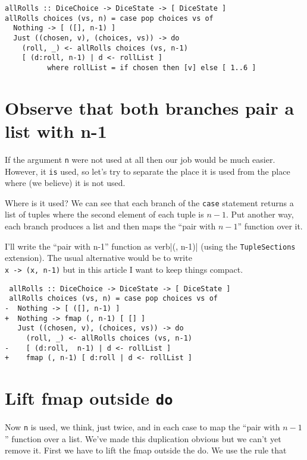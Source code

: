 \begin{verbatim}
allRolls :: DiceChoice -> DiceState -> [ DiceState ]
allRolls choices (vs, n) = case pop choices vs of
  Nothing -> [ ([], n-1) ]
  Just ((chosen, v), (choices, vs)) -> do
    (roll, _) <- allRolls choices (vs, n-1)
    [ (d:roll, n-1) | d <- rollList ]
          where rollList = if chosen then [v] else [ 1..6 ]
\end{verbatim}


\section{Observe that both branches pair a list with n-1}


If the argument \texttt{n} were not used at all then our job would be much easier. However, it \texttt{is} used, so let's try to separate the place it is used from the place where (we believe) it is not used.

Where is it used? We can see that each branch of the \texttt{case} statement returns a list of tuples where the second element of each tuple is $n-1$. Put another way, each branch produces a list and then maps the ``pair with $n-1$'' function over it.

I'll write the ``pair with n-1'' function as verb|(, n-1)| (using the \texttt{TupleSections} extension). The usual alternative would be to write \texttt{\\x -> (x, n-1)} but in this article I want to keep things compact.

\begin{verbatim}
 allRolls :: DiceChoice -> DiceState -> [ DiceState ]
 allRolls choices (vs, n) = case pop choices vs of
-  Nothing -> [ ([], n-1) ]
+  Nothing -> fmap (, n-1) [ [] ]
   Just ((chosen, v), (choices, vs)) -> do
     (roll, _) <- allRolls choices (vs, n-1)
-    [ (d:roll,  n-1) | d <- rollList ]
+    fmap (, n-1) [ d:roll | d <- rollList ]
\end{verbatim}


\section{Lift fmap outside \texttt{do}}


Now \texttt{n} is used, we think, just twice, and in each case to map the ``pair with $n-1$'' function over a list. We've made this duplication obvious but we can't yet remove it. First we have to lift the fmap outside the do. We use the rule that

